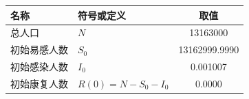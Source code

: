 \begin{tabularx}{\textwidth}{@{}>{\raggedright\arraybackslash}p{}>{\centering\arraybackslash}X S[table-format=8.6]@{}}
\toprule
名称 & 符号或定义 & {取值} \\
\midrule
总人口 & $N$ & 13163000 \\
初始易感人数 & $S_0$ & 13162999.9990 \\
初始感染人数 & $I_0$ & 0.001007 \\
初始康复人数 & $R(0)=N-S_0-I_0$ & 0.0000 \\
\bottomrule
\end{tabularx}
